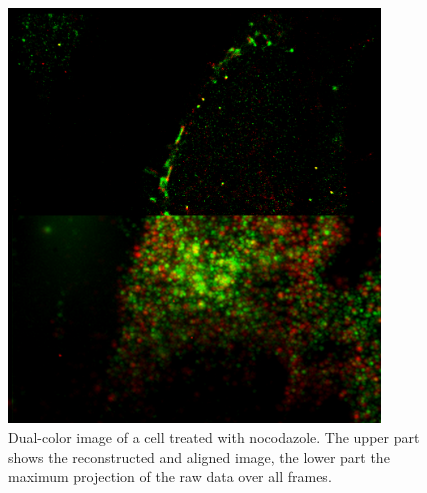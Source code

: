 \begin{figure}
\centering
\includegraphics[width = 0.88\textwidth]{pictures/alignedStormWidefield.png}
	\caption{Dual-color image of a cell treated with nocodazole. The upper part shows the reconstructed and aligned image, the lower part the maximum projection of the raw data over all frames.}
	\label{dualcolor}
\end{figure}


